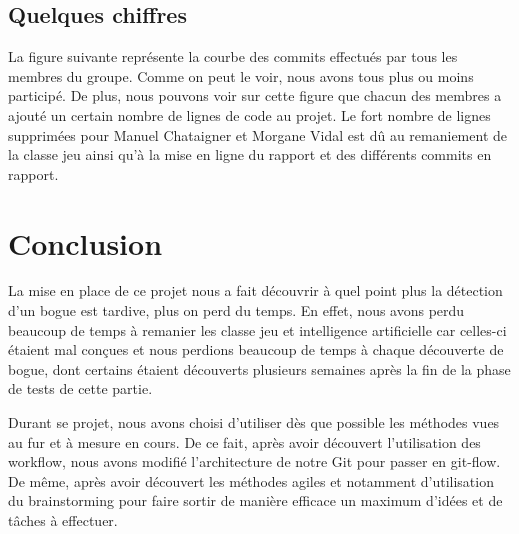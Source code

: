 \documentclass{report}
\begin{document}
\section{Quelques chiffres}
\hspace{0.5cm}La figure suivante représente la courbe des commits effectués par tous les membres du groupe. Comme on peut le voir, nous avons tous plus ou moins participé. De plus, nous pouvons voir sur cette figure que chacun des membres a ajouté un certain nombre de lignes de code au projet. Le fort nombre de lignes supprimées pour Manuel Chataigner et Morgane Vidal est dû au remaniement de la classe jeu ainsi qu'à la mise en ligne du rapport et des différents commits en rapport.\par





\chapter{Conclusion}

\hspace{0.5cm}La mise en place de ce projet nous a fait découvrir à quel point plus la détection d'un bogue est tardive, plus on perd du temps. En effet, nous avons perdu beaucoup de temps à remanier les classe jeu et intelligence artificielle car celles-ci étaient mal conçues et nous perdions beaucoup de temps à chaque découverte de bogue, dont certains étaient découverts plusieurs semaines après la fin de la phase de tests de cette partie. \par
Durant se projet, nous avons choisi d'utiliser dès que possible les méthodes vues au fur et à mesure en cours. De ce fait, après avoir découvert l'utilisation des workflow, nous avons modifié l'architecture de notre Git pour passer en git-flow. De même, après avoir découvert les méthodes agiles et notamment d'utilisation du brainstorming pour faire sortir de manière efficace un maximum d'idées et de tâches à effectuer. \par

\appendix
\end{document}
